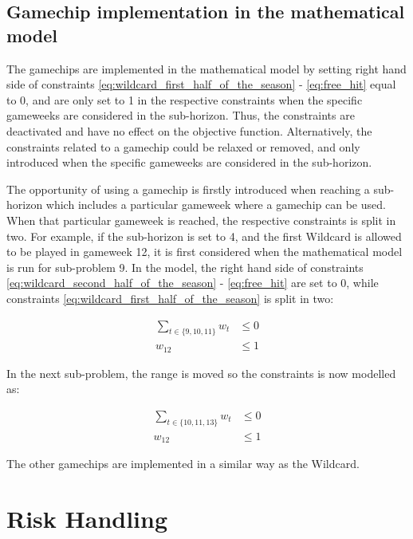 \subsection{Gamechip implementation in the mathematical model}

The gamechips are implemented in the mathematical model by setting right hand side of constraints \ref{eq:wildcard_first_half_of_the_season} - \ref{eq:free_hit} equal to 0, and are only set to 1 in the respective constraints when the specific gameweeks are considered in the sub-horizon. Thus, the constraints are deactivated and have no effect on the objective function. Alternatively, the constraints related to a gamechip could be relaxed or removed, and only introduced when the specific gameweeks are considered in the sub-horizon.

\newpar


The opportunity of using a gamechip is firstly introduced when reaching a sub-horizon which includes a particular gameweek where a gamechip can be used. When that particular gameweek is reached, the respective constraints is split in two. For example, if the sub-horizon is set to 4, and the first Wildcard is allowed to be played in gameweek 12, it is first considered when the mathematical model is run for sub-problem 9. In the model, the right hand side of constraints \ref{eq:wildcard_second_half_of_the_season} - \ref{eq:free_hit} are set to 0, while constraints \ref{eq:wildcard_first_half_of_the_season} is split in two: 

\begin{equation*}
    \begin{aligned}
      \sum_{t \in \{9,10,11 \}} w_{t} & \leq 0 \\
         w_{12} & \leq 1
    \end{aligned}
\end{equation*}

In the next sub-problem, the range is moved so the constraints is now modelled as: 

\begin{equation*}
    \begin{aligned}
      \sum_{t \in \{10,11,13\}} w_{t} & \leq 0 \\
         w_{12} & \leq 1
    \end{aligned}
\end{equation*}

The other gamechips are implemented in a similar way as the Wildcard. 


\section{Risk Handling} \label{Ch.5_Variance_tradeoff}

